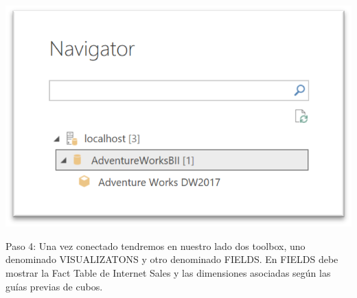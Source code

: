 \documentclass[12pt,letterpaper]{article}
\begin{document}
\begin{center}
    \includegraphics[width=16cm]{img/4.png}  
\end{center}
Paso 4: Una vez conectado tendremos en nuestro lado dos toolbox, uno denominado VISUALIZATONS y otro denominado FIELDS.
En FIELDS debe mostrar la Fact Table de Internet Sales y las dimensiones asociadas según las guías previas de cubos.
\end{document}
